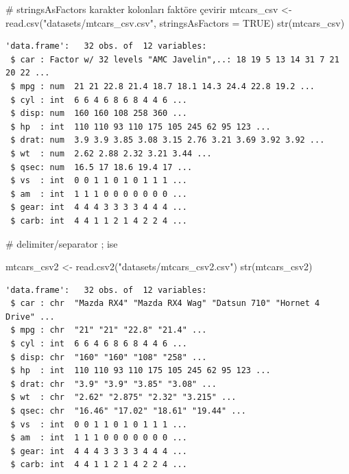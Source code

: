 \documentclass[
  letterpaper,
  DIV=11,
  numbers=noendperiod]{scrreprt}
\newenvironment{Shaded}{\begin{snugshade}}{\end{snugshade}}
\newcommand{\AttributeTok}[1]{\textcolor[rgb]{0.40,0.45,0.13}{#1}}
\newcommand{\CommentTok}[1]{\textcolor[rgb]{0.37,0.37,0.37}{#1}}
\newcommand{\ConstantTok}[1]{\textcolor[rgb]{0.56,0.35,0.01}{#1}}
\newcommand{\FunctionTok}[1]{\textcolor[rgb]{0.28,0.35,0.67}{#1}}
\newcommand{\NormalTok}[1]{\textcolor[rgb]{0.00,0.23,0.31}{#1}}
\newcommand{\OtherTok}[1]{\textcolor[rgb]{0.00,0.23,0.31}{#1}}
\newcommand{\StringTok}[1]{\textcolor[rgb]{0.13,0.47,0.30}{#1}}
\begin{document}
\begin{Shaded}
\begin{Highlighting}[]
\CommentTok{\# stringsAsFactors karakter kolonları faktöre çevirir}
\NormalTok{mtcars\_csv }\OtherTok{\textless{}{-}} \FunctionTok{read.csv}\NormalTok{(}\StringTok{"datasets/mtcars\_csv.csv"}\NormalTok{,}
                       \AttributeTok{stringsAsFactors =} \ConstantTok{TRUE}\NormalTok{)}
\FunctionTok{str}\NormalTok{(mtcars\_csv)}
\end{Highlighting}
\end{Shaded}

\begin{verbatim}
'data.frame':   32 obs. of  12 variables:
 $ car : Factor w/ 32 levels "AMC Javelin",..: 18 19 5 13 14 31 7 21 20 22 ...
 $ mpg : num  21 21 22.8 21.4 18.7 18.1 14.3 24.4 22.8 19.2 ...
 $ cyl : int  6 6 4 6 8 6 8 4 4 6 ...
 $ disp: num  160 160 108 258 360 ...
 $ hp  : int  110 110 93 110 175 105 245 62 95 123 ...
 $ drat: num  3.9 3.9 3.85 3.08 3.15 2.76 3.21 3.69 3.92 3.92 ...
 $ wt  : num  2.62 2.88 2.32 3.21 3.44 ...
 $ qsec: num  16.5 17 18.6 19.4 17 ...
 $ vs  : int  0 0 1 1 0 1 0 1 1 1 ...
 $ am  : int  1 1 1 0 0 0 0 0 0 0 ...
 $ gear: int  4 4 4 3 3 3 3 4 4 4 ...
 $ carb: int  4 4 1 1 2 1 4 2 2 4 ...
\end{verbatim}

\begin{Shaded}
\begin{Highlighting}[]
\CommentTok{\# delimiter/separator ; ise}

\NormalTok{mtcars\_csv2 }\OtherTok{\textless{}{-}} \FunctionTok{read.csv2}\NormalTok{(}\StringTok{"datasets/mtcars\_csv2.csv"}\NormalTok{)}
\FunctionTok{str}\NormalTok{(mtcars\_csv2)}
\end{Highlighting}
\end{Shaded}

\begin{verbatim}
'data.frame':   32 obs. of  12 variables:
 $ car : chr  "Mazda RX4" "Mazda RX4 Wag" "Datsun 710" "Hornet 4 Drive" ...
 $ mpg : chr  "21" "21" "22.8" "21.4" ...
 $ cyl : int  6 6 4 6 8 6 8 4 4 6 ...
 $ disp: chr  "160" "160" "108" "258" ...
 $ hp  : int  110 110 93 110 175 105 245 62 95 123 ...
 $ drat: chr  "3.9" "3.9" "3.85" "3.08" ...
 $ wt  : chr  "2.62" "2.875" "2.32" "3.215" ...
 $ qsec: chr  "16.46" "17.02" "18.61" "19.44" ...
 $ vs  : int  0 0 1 1 0 1 0 1 1 1 ...
 $ am  : int  1 1 1 0 0 0 0 0 0 0 ...
 $ gear: int  4 4 4 3 3 3 3 4 4 4 ...
 $ carb: int  4 4 1 1 2 1 4 2 2 4 ...
\end{verbatim}
\end{document}
